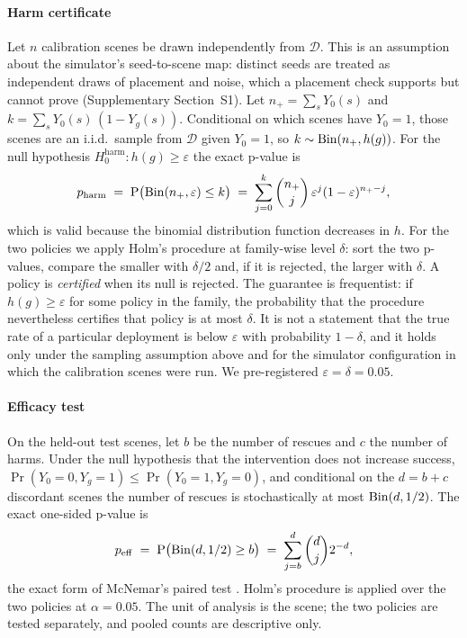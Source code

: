 \paragraph{Harm certificate} Let $n$ calibration scenes be drawn independently from $\mathcal{D}$. This is an assumption about the simulator's seed-to-scene map: distinct seeds are treated as independent draws of placement and noise, which a placement check supports but cannot prove (Supplementary Section~S1). Let $n_+=\sum_s Y_0(s)$ and $k=\sum_s Y_0(s)\,(1-Y_g(s))$. Conditional on which scenes have $Y_0=1$, those scenes are an i.i.d.\ sample from $\mathcal{D}$ given $Y_0=1$, so $k\sim\operatorname{Bin}(n_+, h(g))$. For the null hypothesis $H_0^{\mathrm{harm}}: h(g)\ge\varepsilon$ the exact p-value is
\begin{equation}\label{eq:cert}
p_{\mathrm{harm}} \;=\; \operatorname{P}\bigl(\operatorname{Bin}(n_+,\varepsilon)\le k\bigr) \;=\; \sum_{j=0}^{k}\binom{n_+}{j}\,\varepsilon^{j}(1-\varepsilon)^{n_+-j},
\end{equation}
which is valid because the binomial distribution function decreases in $h$. For the two policies we apply Holm's procedure \cite{holm1979} at family-wise level $\delta$: sort the two p-values, compare the smaller with $\delta/2$ and, if it is rejected, the larger with $\delta$. A policy is \emph{certified} when its null is rejected. The guarantee is frequentist: if $h(g)\ge\varepsilon$ for some policy in the family, the probability that the procedure nevertheless certifies that policy is at most $\delta$. It is not a statement that the true rate of a particular deployment is below $\varepsilon$ with probability $1-\delta$, and it holds only under the sampling assumption above and for the simulator configuration in which the calibration scenes were run. We pre-registered $\varepsilon=\delta=0.05$.

\paragraph{Efficacy test} On the held-out test scenes, let $b$ be the number of rescues and $c$ the number of harms. Under the null hypothesis that the intervention does not increase success, $\Pr(Y_0=0,Y_g=1)\le\Pr(Y_0=1,Y_g=0)$, and conditional on the $d=b+c$ discordant scenes the number of rescues is stochastically at most $\operatorname{Bin}(d,1/2)$. The exact one-sided p-value is
\begin{equation}\label{eq:eff}
p_{\mathrm{eff}} \;=\; \operatorname{P}\bigl(\operatorname{Bin}(d,1/2)\ge b\bigr) \;=\; \sum_{j=b}^{d}\binom{d}{j}2^{-d},
\end{equation}
the exact form of McNemar's paired test \cite{mcnemar1947}. Holm's procedure is applied over the two policies at $\alpha=0.05$. The unit of analysis is the scene; the two policies are tested separately, and pooled counts are descriptive only.

